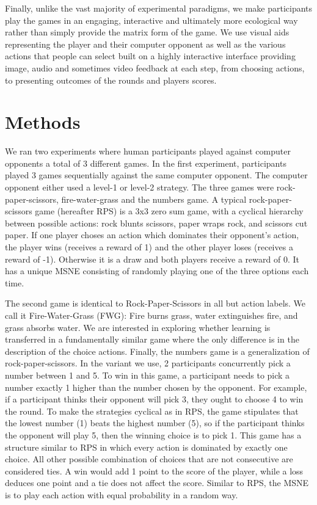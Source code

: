 \documentclass[12pt]{article}         %
\begin{document}
Finally, unlike the vast majority of experimental paradigms, we make participants play the games in an engaging, interactive and ultimately more ecological way rather than simply provide the matrix form of the game. We use visual aids representing the player and their computer opponent as well as the various actions that people can select built on a highly interactive interface providing image, audio and sometimes video feedback at each step, from choosing actions, to presenting outcomes of the rounds and players scores. 



\section*{Methods}

We ran two experiments where human participants played against computer opponents a total of 3 different games. In the first experiment, participants played 3 games sequentially against the same computer opponent. The computer opponent either used a level-1 or level-2 strategy. The three games were rock-paper-scissors, fire-water-grass and the numbers game.  A typical rock-paper-scissors game (hereafter RPS) is a 3x3 zero sum game, with a cyclical hierarchy between possible actions: rock blunts scissors, paper wraps rock, and scissors cut paper. If one player choses an action which dominates their opponent's action, the player wins (receives a reward of 1) and the other player loses (receives a reward of -1). Otherwise it is a draw and both players receive a reward of 0. It has a unique MSNE consisting of randomly playing one of the three options each time.  

The second game is identical to Rock-Paper-Scissors in all but action labels. We call it Fire-Water-Grass (FWG): Fire burns grass, water extinguishes fire, and grass absorbs water. We are interested in exploring whether learning is transferred in a fundamentally similar game where the only difference is in the description of the choice actions.  Finally, the numbers game is a generalization of rock-paper-scissors. In the variant we use, 2 participants concurrently pick a number between 1 and 5. To win in this game, a participant needs to pick a number exactly 1 higher than the number chosen by the opponent. For example, if a participant thinks their opponent will pick 3, they ought to choose 4 to win the round. To make the strategies cyclical as in RPS, the game stipulates that the lowest number (1) beats the highest number (5), so if the participant thinks the opponent will play 5, then the winning choice is to pick 1. This game has a structure similar to RPS in which every action is dominated by exactly one choice. All other possible combination of choices that are not consecutive are considered ties. A win would add 1 point to the score of the player, while a loss deduces one point and a tie does not affect the score. Similar to RPS, the MSNE is to play each action with equal probability in a random way.  
\end{document}
